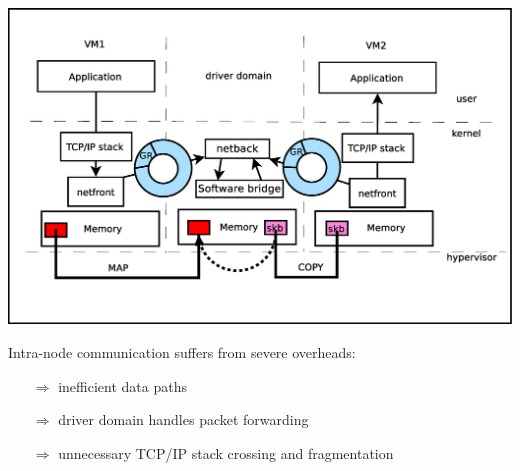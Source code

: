 \documentclass[a0paper,portrait,final]{baposter}
\newcommand{\compresslist}{%
\setlength{\itemsep}{0.1em}%
\setlength{\parskip}{0.0pt}%
\setlength{\parsep}{0.0pt}%
}
\begin{document}
\begin{poster}
{%
\begin{center}
\includegraphics[width=.9\linewidth]{figures/netfront_netback.eps}
\end{center}
Intra-node communication suffers from severe overheads:

\begin{itemize}
\compresslist
\item[$\Rightarrow$] inefficient data paths

\item[$\Rightarrow$] driver domain handles packet forwarding

\item[$\Rightarrow$] unnecessary TCP/IP stack crossing and fragmentation

\end{itemize}
\vspace{0.5em}

}

\end{poster}
\end{document}
